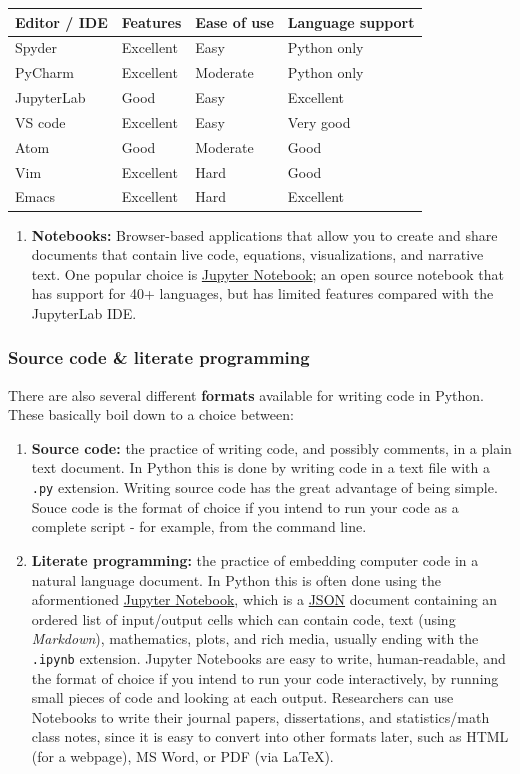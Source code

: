 \documentclass[
]{book}
\providecommand{\tightlist}{%
  \setlength{\itemsep}{0pt}\setlength{\parskip}{0pt}}
\begin{document}
\begin{longtable}[]{@{}llll@{}}
\toprule
Editor / IDE & Features & Ease of use & Language support\tabularnewline
\midrule
\endhead
Spyder & Excellent & Easy & Python only\tabularnewline
PyCharm & Excellent & Moderate & Python only\tabularnewline
JupyterLab & Good & Easy & Excellent\tabularnewline
VS code & Excellent & Easy & Very good\tabularnewline
Atom & Good & Moderate & Good\tabularnewline
Vim & Excellent & Hard & Good\tabularnewline
Emacs & Excellent & Hard & Excellent\tabularnewline
\bottomrule
\end{longtable}

\begin{enumerate}
\def\labelenumi{\arabic{enumi}.}
\setcounter{enumi}{1}
\tightlist
\item
  \textbf{Notebooks:} Browser-based applications that allow you to create and share documents that contain live code, equations, visualizations, and narrative text. One popular choice is \href{https://jupyter.org/}{Jupyter Notebook}; an open source notebook that has support for 40+ languages, but has limited features compared with the JupyterLab IDE.
\end{enumerate}

\hypertarget{source-code-literate-programming-1}{%
\subsubsection{Source code \& literate programming}\label{source-code-literate-programming-1}}

There are also several different \textbf{formats} available for writing code in Python.
These basically boil down to a choice between:

\begin{enumerate}
\def\labelenumi{\arabic{enumi}.}
\item
  \textbf{Source code:} the practice of writing code, and possibly comments, in a plain text document. In Python this is done by writing code in a text file with a \texttt{.py} extension. Writing source code has the great advantage of being simple. Souce code is the format of choice if you intend to run your code as a complete script - for example, from the command line.
\item
  \textbf{Literate programming:} the practice of embedding computer code in a natural language document. In Python this is often done using the aformentioned \href{https://jupyter.org/}{Jupyter Notebook}, which is a \href{https://www.json.org/json-en.html}{JSON} document containing an ordered list of input/output cells which can contain code, text (using \emph{Markdown}), mathematics, plots, and rich media, usually ending with the \texttt{.ipynb} extension. Jupyter Notebooks are easy to write, human-readable, and the format of choice if you intend to run your code interactively, by running small pieces of code and looking at each output. Researchers can use Notebooks to write their journal papers, dissertations, and statistics/math class notes, since it is easy to convert into other formats later, such as HTML (for a webpage), MS Word, or PDF (via LaTeX).
\end{enumerate}
\end{document}
